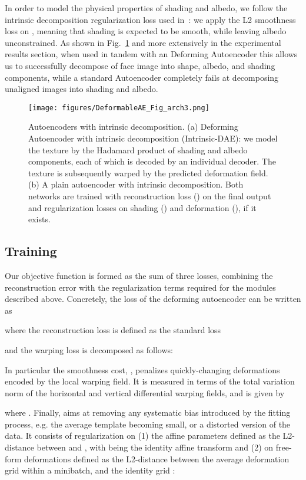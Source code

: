 \documentclass[runningheads]{llncs}
\begin{document}
In order to model the physical properties of shading and albedo, we follow the intrinsic decomposition regularization loss used in~\cite{ShuYHSSS17}: we apply the L2 smoothness loss on , meaning that shading is expected to be smooth, while leaving albedo unconstrained. As shown in Fig.~\ref{fig:daeIntrinsicStructure} and more extensively in the experimental results section, when used in tandem with an Deforming Autoencoder this allows us to successfully decompose of face image into shape, albedo, and shading components, while a standard Autoencoder completely fails at decomposing unaligned images into shading and albedo.   
\begin{figure}[h]
    \centering
    \texttt{[image: figures/DeformableAE\_Fig\_arch3.png]}
    \caption{Autoencoders with intrinsic decomposition. (a) Deforming Autoencoder with intrinsic decomposition (Intrinsic-DAE): we model the texture by the Hadamard product of shading and albedo components, each of which is decoded by an individual decoder. The texture is subsequently warped by the predicted deformation field. (b) A plain autoencoder with intrinsic decomposition. Both networks are trained with reconstruction loss () on the final output and regularization losses on shading () and deformation (), if it exists. }
    \label{fig:daeIntrinsicStructure}
\end{figure}


\subsection{Training}

Our objective function is formed as the sum of three losses, combining the reconstruction error with the regularization terms required for the modules described above. Concretely, the loss of the deforming autoencoder can be written as

where the reconstruction loss is defined as the standard  loss

and the warping loss is decomposed as follows:

In particular the smoothness cost, , penalizes quickly-changing deformations encoded by the local warping field. It is measured in terms of the total variation 
norm of the horizontal and vertical differential warping fields, and is given by

where .
Finally,  aims at removing any systematic bias introduced by the fitting process, e.g. the average template becoming small, or a distorted version of the data. It consists of regularization
on (1) the affine parameters defined as the L2-distance between  and ,  with
 being the identity affine transform and (2) on free-form deformations defined as the L2-distance between the average deformation grid within a minibatch,  and the identity grid :
\end{document}

